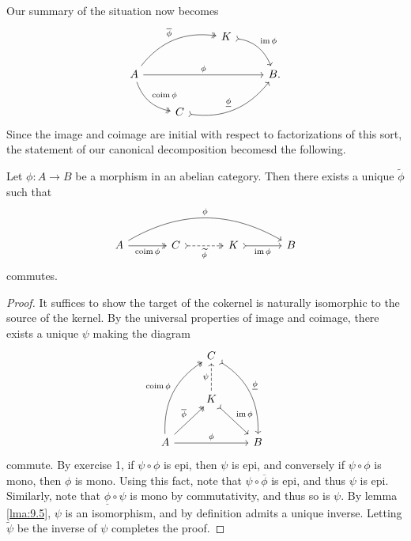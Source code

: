 Our summary of the situation now becomes
\[\begin{tikzcd}[row sep = 2em, column sep = 2.5em]
	&&K\arrow[dr, bend left, tail, "\im \phi "]\\
	A\arrow[rrr, "\phi "]\arrow[dr, bend right, two heads, "\operatorname{coim} \phi "]\arrow[urr, bend left, two heads, " \overline{\phi } "]&&&B.\\
			     &C\arrow[rru, bend right, tail, " \underline{\phi }"]
\end{tikzcd}\]
Since the image and coimage are initial with respect to factorizations of this sort, the statement of our canonical decomposition becomesd the following.

\begin{theorem}\label{thm:9.1}
	Let $\phi : A \to B$ be a morphism in an abelian category. Then there exists a unique $\widetilde{\phi } $ such that
	\[\begin{tikzcd}[row sep = 2.5em, column sep = 3.5em]
		A\arrow[rrr, bend left, "\phi "]\arrow[r, two heads, "\operatorname{coim} \phi "']&C\arrow[r, dashed, tail, two heads, "\widetilde{\phi }"']&K\arrow[r, tail, "\im \phi "']&B
	\end{tikzcd}\]
	commutes.
\end{theorem}
\begin{proof}
	It suffices to show the target of the cokernel is naturally isomorphic to the source of the kernel. By the universal properties of image and coimage, there exists a unique $\psi $ making the diagram
	\[\begin{tikzcd}[row sep = 2.5em, column sep = 2.5em]
		&C\arrow[ddr, bend left, tail, "\underline{\phi }"]\\
		&K\arrow[dr, tail, "\im \phi "]\arrow[u, dashed, "\psi"]\\
		A\arrow[ur, two heads, " \overline{\phi } "]\arrow[uur, bend left, two heads, "\operatorname{coim} \phi "]\arrow[rr, "\phi "]&&B
	\end{tikzcd}\]
	commute. By exercise 1, if $\psi \circ \phi $ is epi, then $\psi $ is epi, and conversely if $\psi \circ \phi $ is mono, then $\phi $ is mono. Using this fact, note that $\psi \circ \overline{\phi } $ is epi, and thus $\psi $ is epi. Similarly, note that $\underline{\phi }\circ \psi $ is mono by commutativity, and thus so is $\psi $. By lemma \ref{lma:9.5}, $\psi $ is an isomorphism, and by definition admits a unique inverse. Letting $\widetilde{\psi } $ be the inverse of $\psi $ completes the proof.
\end{proof}
